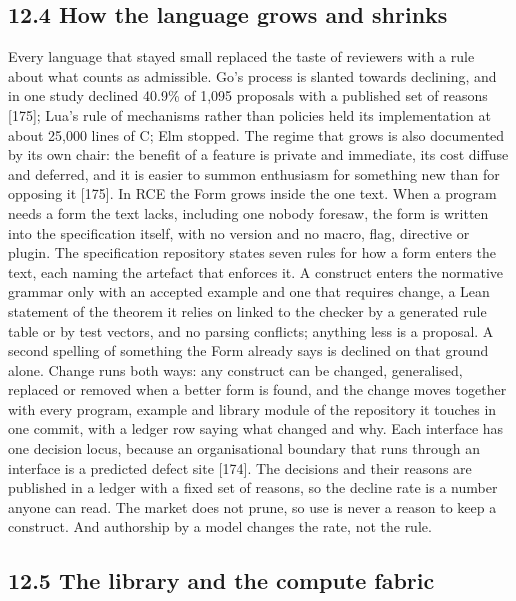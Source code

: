 \documentclass[10pt,letterpaper]{article}
\begin{document}
\subsection{12.4 How the language grows and
shrinks}\label{how-the-language-grows-and-shrinks}

Every language that stayed small replaced the taste of reviewers with a
rule about what counts as admissible. Go's process is slanted towards
declining, and in one study declined 40.9\% of 1,095 proposals with a
published set of reasons {[}175{]}; Lua's rule of mechanisms rather than
policies held its implementation at about 25,000 lines of C; Elm
stopped. The regime that grows is also documented by its own chair: the
benefit of a feature is private and immediate, its cost diffuse and
deferred, and it is easier to summon enthusiasm for something new than
for opposing it {[}175{]}. In RCE the Form grows inside the one text.
When a program needs a form the text lacks, including one nobody
foresaw, the form is written into the specification itself, with no
version and no macro, flag, directive or plugin. The specification
repository states seven rules for how a form enters the text, each
naming the artefact that enforces it. A construct enters the normative
grammar only with an accepted example and one that requires change, a
Lean statement of the theorem it relies on linked to the checker by a
generated rule table or by test vectors, and no parsing conflicts;
anything less is a proposal. A second spelling of something the Form
already says is declined on that ground alone. Change runs both ways:
any construct can be changed, generalised, replaced or removed when a
better form is found, and the change moves together with every program,
example and library module of the repository it touches in one commit,
with a ledger row saying what changed and why. Each interface has one
decision locus, because an organisational boundary that runs through an
interface is a predicted defect site {[}174{]}. The decisions and their
reasons are published in a ledger with a fixed set of reasons, so the
decline rate is a number anyone can read. The market does not prune, so
use is never a reason to keep a construct. And authorship by a model
changes the rate, not the rule.

\subsection{12.5 The library and the compute
fabric}\label{the-library-and-the-compute-fabric}
\end{document}
